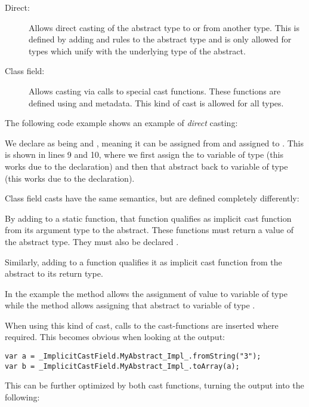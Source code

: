\begin{description}
	\item[Direct:] Allows direct casting of the abstract type to or from another type. This is defined by adding  and  rules to the abstract type and is only allowed for types which unify with the underlying type of the abstract.
	\item[Class field:] Allows casting via calls to special cast functions. These functions are defined using  and  metadata. This kind of cast is allowed for all types.
\end{description}
The following code example shows an example of \emph{direct} casting:

We declare  as being  and , meaning it can be assigned from  and assigned to . This is shown in lines 9 and 10, where we first assign the   to variable  of type  (this works due to the  declaration) and then that abstract back to variable  of type  (this works due to the  declaration).

Class field casts have the same semantics, but are defined completely differently:

By adding  to a static function, that function qualifies as implicit cast function from its argument type to the abstract. These functions must return a value of the abstract type. They must also be declared .

Similarly, adding  to a function qualifies it as implicit cast function from the abstract to its return type.

In the example the method  allows the assignment of value  to variable  of type  while the method  allows assigning that abstract to variable  of type .

When using this kind of cast, calls to the cast-functions are inserted where required. This becomes obvious when looking at the  output:

\begin{lstlisting}
var a = _ImplicitCastField.MyAbstract_Impl_.fromString("3");
var b = _ImplicitCastField.MyAbstract_Impl_.toArray(a);
\end{lstlisting}
This can be further optimized by  both cast functions, turning the output into the following:

